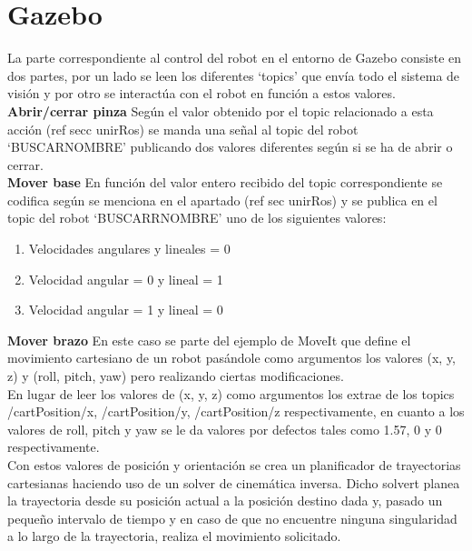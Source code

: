 \section{Gazebo}
La parte correspondiente al control del robot en el entorno de Gazebo consiste en dos partes, por un lado se leen los diferentes ‘topics’ que envía todo el sistema de visión y por otro se interactúa con el robot en función a estos valores.\\
\textbf{Abrir/cerrar pinza}
Según el valor obtenido por el topic relacionado a esta acción (ref secc unirRos) se manda una señal al topic del robot ‘BUSCARNOMBRE’ publicando dos valores diferentes según si se ha de abrir o cerrar.\\
\textbf{Mover base}
En función del valor entero recibido del topic correspondiente se codifica según se menciona en el apartado (ref sec unirRos) y se publica en el topic del robot ‘BUSCARRNOMBRE’ uno de los siguientes valores:\\
\begin{enumerate}
  \item Velocidades angulares y lineales = 0
  \item Velocidad angular = 0 y lineal = 1
  \item Velocidad angular = 1 y lineal = 0
\end{enumerate}
\textbf{Mover brazo}
En este caso se parte del ejemplo de MoveIt que define el movimiento cartesiano de un robot pasándole como argumentos los valores (x, y, z) y (roll, pitch, yaw) pero realizando ciertas modificaciones.\\

En lugar de leer los valores de (x, y, z) como argumentos los extrae de los topics /cartPosition/x, /cartPosition/y, /cartPosition/z respectivamente, en cuanto a los valores de roll, pitch y yaw se le da valores por defectos tales como 1.57, 0 y 0 respectivamente.\\

Con estos valores de posición y orientación se crea un planificador de trayectorias cartesianas haciendo uso de un solver de cinemática inversa. Dicho solvert planea la trayectoria desde su posición actual a la posición destino dada y, pasado un pequeño intervalo de tiempo y en caso de que no encuentre ninguna singularidad a lo largo de la trayectoria, realiza el movimiento solicitado.\\

